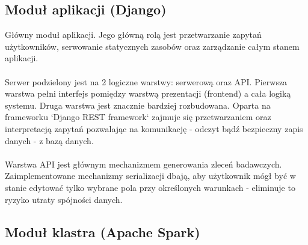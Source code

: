 \documentclass[a4paper,onecolumn,oneside,12pt]{memoir}
\begin{document}
{\subsection{Moduł aplikacji (Django)}
\quad \quad Główny moduł aplikacji. Jego główną rolą jest przetwarzanie zapytań użytkowników,
serwowanie statycznych zasobów oraz zarządzanie całym stanem aplikacji.\\
\\
Serwer podzielony jest na 2 logiczne warstwy: serwerową oraz API. Pierwsza warstwa
pełni interfejs pomiędzy warstwą prezentacji (frontend) a cała logiką systemu.
Druga warstwa jest znacznie bardziej rozbudowana. Oparta na frameworku `Django REST
framework` zajmuje się przetwarzaniem oraz interpretacją zapytań pozwalając na
komunikację - odczyt bądź bezpieczny zapis danych - z bazą danych.\\
\\
Warstwa API jest głównym mechanizmem generowania zleceń badawczych. Zaimplementowane
mechanizmy serializacji dbają, aby użytkownik mógł być w stanie edytować tylko
wybrane pola przy określonych warunkach - eliminuje to ryzyko utraty spójności
danych.\\

\subsection{Moduł klastra (Apache Spark)}
\quad \quad 
}
\end{document}
